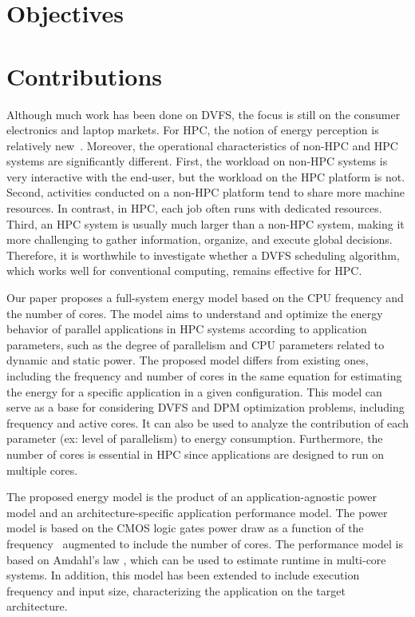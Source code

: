 \section{Objectives} \label{sec:objectives}


\section{Contributions} \label{sec:contributions}

Although much work has been done on DVFS, the focus is still on the consumer electronics and laptop markets. 
For HPC, the notion of energy perception is relatively new~\cite{Feng2003MakingSupercomputing}. 
Moreover, the operational characteristics of non-HPC and HPC systems are significantly different. 
First, the workload on non-HPC systems is very interactive with the end-user, but the workload on the HPC platform is not.
Second, activities conducted on a non-HPC platform tend to share more machine resources.
In contrast, in HPC, each job often runs with dedicated resources. 
Third, an HPC system is usually much larger than a non-HPC system, making it more challenging to gather information, organize, and execute global decisions.
Therefore, it is worthwhile to investigate whether a DVFS scheduling algorithm, which works well for conventional computing, remains effective for HPC.

Our paper proposes a full-system energy model based on the CPU frequency and the number of cores. The model aims to understand and optimize the energy behavior of parallel applications in HPC systems according to application parameters, such as the degree of parallelism and CPU parameters related to dynamic and static power. The proposed model differs from existing ones, including the frequency and number of cores in the same equation for estimating the energy for a specific application in a given configuration. This model can serve as a base for considering DVFS and DPM optimization problems, including frequency and active cores. It can also be used to analyze the contribution of each parameter (ex: level of parallelism) to energy consumption. Furthermore, the number of cores is essential in HPC since applications are designed to run on multiple cores.

The proposed energy model is the product of an application-agnostic power model and an architecture-specific application performance model. The power model is based on the CMOS logic gates power draw as a function of the frequency~\cite{Sarwar1997CmosCalculation, Butzen2007LeakageGates} augmented to include the number of cores. The performance model is based on Amdahl's law \cite{Amdahl1967ValidityCapabilities, Eyerman2010ModelingDesign, Gustafson1988ReevaluatingLaw}, which can be used to estimate runtime in multi-core systems. In addition, this model has been extended to include execution frequency and input size, characterizing the application on the target architecture.


